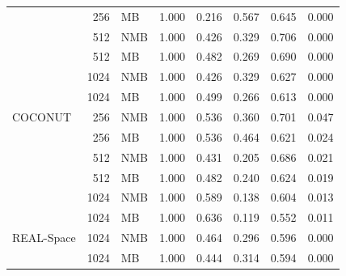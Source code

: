 \begin{table}[htbp]
\begin{tabular}{@{}l r l r r r r r@{}}
     & 256 & MB & 1.000 & 0.216 & 0.567 & 0.645 & 0.000 \\
     & 512 & NMB & 1.000 & 0.426 & 0.329 & 0.706 & 0.000 \\
     & 512 & MB & 1.000 & 0.482 & 0.269 & 0.690 & 0.000 \\
     & 1024 & NMB & 1.000 & 0.426 & 0.329 & 0.627 & 0.000 \\
     & 1024 & MB & 1.000 & 0.499 & 0.266 & 0.613 & 0.000 \\
    \addlinespace
    COCONUT & 256 & NMB & 1.000 & 0.536 & 0.360 & 0.701 & 0.047 \\
     & 256 & MB & 1.000 & 0.536 & 0.464 & 0.621 & 0.024 \\
     & 512 & NMB & 1.000 & 0.431 & 0.205 & 0.686 & 0.021 \\
     & 512 & MB & 1.000 & 0.482 & 0.240 & 0.624 & 0.019 \\
     & 1024 & NMB & 1.000 & 0.589 & 0.138 & 0.604 & 0.013 \\
     & 1024 & MB & 1.000 & 0.636 & 0.119 & 0.552 & 0.011 \\
    \addlinespace
    REAL-Space & 1024 & NMB & 1.000 & 0.464 & 0.296 & 0.596 & 0.000 \\
     & 1024 & MB & 1.000 & 0.444 & 0.314 & 0.594 & 0.000 \\
    \bottomrule
  \end{tabular}
\end{table}
